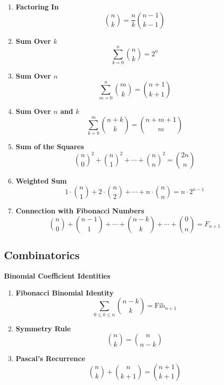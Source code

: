 \documentclass[twoside]{article}
\begin{document}
\begin{multicols*}{2}
\begin{enumerate}[leftmargin=*]
    \item \textbf{Factoring In}
        \[\binom{n}{k} = \frac{n}{k} \binom{n - 1}{k - 1}\]
    
    \item \textbf{Sum Over $k$}
        \[\sum_{k = 0}^{n} \binom{n}{k} = 2^n\]
    
    \item \textbf{Sum Over $n$}
        \[\sum_{m = 0}^{n} \binom{m}{k} = \binom{n + 1}{k + 1}\]
    
    \item \textbf{Sum Over $n$ and $k$}
        \[\sum_{k = 0}^{m} \binom{n + k}{k} = \binom{n + m + 1}{m}\]
    
    \item \textbf{Sum of the Squares}
        \[\binom{n}{0}^2 + \binom{n}{1}^2 + \cdots + \binom{n}{n}^2 = \binom{2n}{n}\]
    
    \item \textbf{Weighted Sum}
        \[1 \cdot \binom{n}{1} + 2 \cdot \binom{n}{2} + \cdots + n \cdot \binom{n}{n} = n \cdot 2^{n - 1}\]
    
    \item \textbf{Connection with Fibonacci Numbers}
        \[\binom{n}{0} + \binom{n - 1}{1} + \cdots + \binom{n - k}{k} + \cdots + \binom{0}{n} = F_{n + 1}\]
\end{enumerate}

{
\subsection*{Combinatorics}
}
\textbf{Binomial Coefficient Identities}
\begin{enumerate}[leftmargin=*]
    \item \textbf{Fibonacci Binomial Identity}
        \[\sum_{0\leq k \leq n} \binom{n-k}{k} = \text{Fib}_{n+1}\]
    
    \item \textbf{Symmetry Rule}
        \[\binom{n}{k} = \binom{n}{n-k}\]
    
    \item \textbf{Pascal's Recurrence}
        \[\binom{n}{k} + \binom{n}{k+1} = \binom{n+1}{k+1}\]
    

\end{enumerate}
\end{multicols*}
\end{document}
